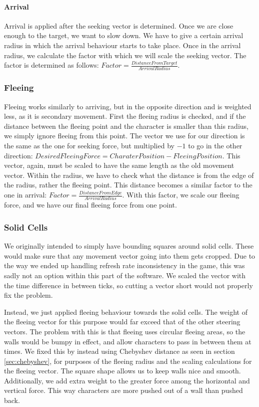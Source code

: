 \paragraph{Arrival}
Arrival is applied after the seeking vector is determined. Once we are close enough to the target, we want to slow down. We have to give a certain arrival radius in which the arrival behaviour starts to take place. Once in the arrival radius, we calculate the factor with which we will scale the seeking vector. The factor is determined as follows: $Factor = \frac{DistanceFromTarget}{ArrivalRadius}$.

\subsubsection{Fleeing}
Fleeing works similarly to arriving, but in the opposite direction and is weighted less, as it is secondary movement. First the fleeing radius is checked, and if the distance between the fleeing point and the character is smaller than this radius, we simply ignore fleeing from this point. The vector we use for our direction is the same as the one for seeking force, but multiplied by $-1$ to go in the other direction: $DesiredFleeingForce = CharaterPosition - FleeingPosition$. This vector, again, must be scaled to have the same length as the old movement vector. Within the radius, we have to check what the distance is from the edge of the radius, rather the fleeing point. This distance becomes a similar factor to the one in arrival: $Factor = \frac{DistanceFromEdge}{ArrivalRadius}$. With this factor, we scale our fleeing force, and we have our final fleeing force from one point.

\subsubsection{Solid Cells}
\label{sec:solid_cells}
We originally intended to simply have bounding squares around solid cells. These would make sure that any movement vector going into them gets cropped. Due to the way we ended up handling refresh rate inconsistency in the game, this was sadly not an option within this part of the software. We scaled the vector with the time difference in between ticks, so cutting a vector short would not properly fix the problem.

Instead, we just applied fleeing behaviour towards the solid cells. The weight of the fleeing vector for this purpose would far exceed that of the other steering vectors. The problem with this is that fleeing uses circular fleeing areas, so the walls would be bumpy in effect, and allow characters to pass in between them at times. We fixed this by instead using Chebyshev distance as seen in section \ref{sec:chebyshev}, for purposes of the fleeing radius and the scaling calculations for the fleeing vector. The square shape allows us to keep walls nice and smooth. Additionally, we add extra weight to the greater force among the horizontal and vertical force. This way characters are more pushed out of a wall than pushed back.

